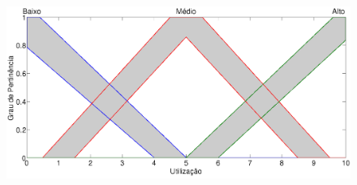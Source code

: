\documentclass[tcc,capa]{texufpel}
\begin{document}
\begin{figure}[h]
\centering
\includegraphics[scale=0.15]{images/Plot2_Utilizacao.png}
 \label{fig:mfutilizacao}
\end{figure}
\end{document}
